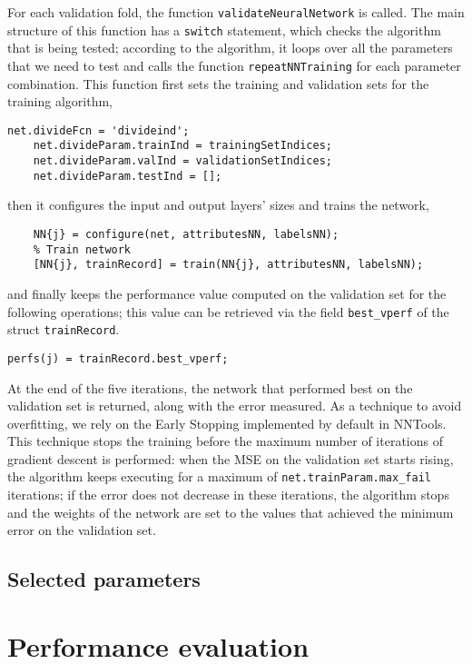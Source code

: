 \documentclass{article}
\begin{document}
For each validation fold, the function \verb$validateNeuralNetwork$ is called. The main structure of this function has a \verb$switch$ statement, which checks the algorithm that is being tested; according to the algorithm, it loops over all the parameters that we need to test and calls the function \verb$repeatNNTraining$ for each parameter combination. This function first sets the training and validation sets for the training algorithm,
\begin{lstlisting}[firstnumber=17]
    net.divideFcn = 'divideind';
    net.divideParam.trainInd = trainingSetIndices;
    net.divideParam.valInd = validationSetIndices;
    net.divideParam.testInd = [];
\end{lstlisting}
then it configures the input and output layers' sizes and trains the network,
\begin{lstlisting}[firstnumber=22]
    % Set up input and output layer
    NN{j} = configure(net, attributesNN, labelsNN);
    % Train network
    [NN{j}, trainRecord] = train(NN{j}, attributesNN, labelsNN);
\end{lstlisting}
and finally keeps the performance value computed on the validation set for the following operations; this value can be retrieved via the field \verb$best_vperf$ of the struct \verb$trainRecord$.
\begin{lstlisting}[firstnumber=30]
    perfs(j) = trainRecord.best_vperf;
\end{lstlisting}
At the end of the five iterations, the network that performed best on the validation set is returned, along with the error measured.
As a technique to avoid overfitting, we rely on the Early Stopping implemented by default in NNTools. This technique stops the training before the maximum number of iterations of gradient descent is performed: when the MSE on the validation set starts rising, the algorithm keeps executing for a maximum of \verb$net.trainParam.max_fail$ iterations; if the error does not decrease in these iterations, the algorithm stops and the weights of the network are set to the values that achieved the minimum error on the validation set.

\subsection{Selected parameters}


\section{Performance evaluation}
\end{document}
